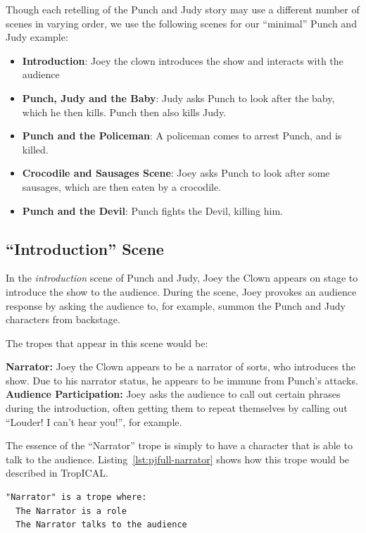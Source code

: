 \documentclass[11pt]{report}
\begin{document}
Though each retelling of the Punch and Judy story may use a different number of
scenes in varying order, we use the following scenes for our ``minimal'' Punch
and Judy example:

\begin{itemize}
\item \textbf{Introduction}: Joey the clown introduces the show and interacts
  with the audience
\item \textbf{Punch, Judy and the Baby}: Judy asks Punch to look after the baby,
  which he then kills. Punch then also kills Judy.
\item \textbf{Punch and the Policeman}: A policeman comes to arrest Punch, and
  is killed.
\item \textbf{Crocodile and Sausages Scene}: Joey asks Punch to look after some
  sausages, which are then eaten by a crocodile.
\item \textbf{Punch and the Devil}: Punch fights the Devil, killing him.
\end{itemize}

\subsection{``Introduction'' Scene}
In the \emph{introduction} scene of Punch and Judy, Joey the Clown appears on stage to
introduce the show to the audience. During the scene, Joey provokes an audience
response by asking the audience to, for example, summon the Punch and Judy
characters from backstage.

The tropes that appear in this scene would be:

\textbf{Narrator:} Joey the Clown appears to be a narrator of sorts, who
introduces the show. Due to his narrator status, he appears to be immune from
Punch's attacks.
\textbf{Audience Participation:} Joey asks the audience to call out certain
phrases during the introduction, often getting them to repeat themselves by
calling out ``Louder! I can't hear you!'', for example.

The essence of the ``Narrator'' trope is simply to have a character that is able
to talk to the audience. Listing~\ref{lst:pjfull-narrator} shows how this trope
would be described in TropICAL.

\begin{lstlisting}[label={lst:pjfull-narrator}, caption={The ``Narrator'' trope}]
"Narrator" is a trope where:
  The Narrator is a role
  The Narrator talks to the audience
\end{lstlisting}
\end{document}
